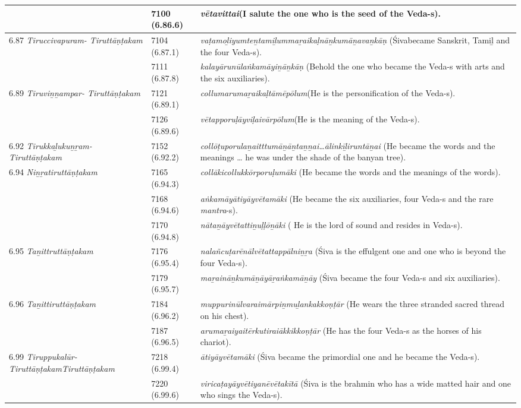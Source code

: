 \begin{longtable}{|m{2.7cm}|m{2.7cm}|>{\raggedright}m{3cm}|}
\hline
 & 7100 (6.86.6) & \textit{vētavittai}(I salute the one who is the seed of the Veda-s). \tabularnewline
\hline
6.87 \textit{Tiruccivapuram- Tiruttāṇṭakam} & 7104 (6.87.1) & \textit{vaṭamoḻiyumteṉtami\-ḻummaṟaikaḷnāṉku\-māṉavaṉkāṇ} (Śivabecame Sanskrit, Tamiḻ and the four Veda-s). \tabularnewline
\hline
 & 7111 (6.87.8) & \textit{kalayārunūlaṅkamāyi\-ṉāṉkāṇ} (Behold the one who became the Veda-s with arts and the six auxiliaries). \tabularnewline
\hline
6.89 \textit{Tiruviṉṉampar- Tiruttāṇṭakam} & 7121 (6.89.1) & \textit{collumarumaṟaikaḷ\-tāmēpōlum}(He is the personification of the Veda-s). \tabularnewline
\hline
 & 7126 (6.89.6) & \textit{vētapporuḷāyviḷaivār\-pōlum}(He is the meaning of the Veda-s). \tabularnewline
\hline
6.92 \textit{Tirukkaḻukuṉṟam- Tiruttāṇṭakam} & 7152 (6.92.2) & \textit{collōṭuporulaṉaitttu\-māṉāṉtaṉṉai…ālinkīḻi\-runtāṉai} (He became the words and the meanings … he was under the shade of the banyan tree). \tabularnewline
\hline
6.94 \textit{Niṉṟatiruttāṇṭakam} & 7165 (6.94.3) & \textit{collākicollukkōrporu\-ḷumāki} (He became the words and the meanings of the words). \tabularnewline
\hline
 & 7168 (6.94.6) & \textit{aṅkamāyātiyāyvēta\-māki} (He became the six auxiliaries, four Veda-s and the rare \textit{mantra}-s). \tabularnewline
\hline
 & 7170 (6.94.8) & \textit{nātaṉāyvētattiṉuḷḷōṉāki }( He is the lord of sound and resides in Veda-s). \tabularnewline
\hline
6.95 \textit{Taṉittruttāṇṭakam} & 7176 (6.95.4) & \textit{nalañcuṭarēnālvētatta\-ppālniṉṟa} (Śiva is the effulgent one and one who is beyond the four Veda-s). \tabularnewline
\hline
 & 7179 (6.95.7) & \textit{maṟaināṉkumāṉāyā\-ṟaṅkamāṉāy} (Śiva became the four Veda-s and six auxiliaries). \tabularnewline
\hline
6.96 \textit{Taṉittiruttāṇ\-ṭakam} & 7184 (6.96.2) & \textit{muppurinūlvaraimār\-piṉmuḻankakkoṇṭār} (He wears the three stranded sacred thread on his chest). \tabularnewline
\hline
 & 7187 (6.96.5) & \textit{arumaṟaiyaitērkuti\-raiākkikkoṇṭār} (He has the four Veda-s as the horses of his chariot). \tabularnewline
\hline
6.99 \textit{Tiruppukalūr- Tiruttāṇṭakam\-Tiruttāṇṭakam} & 7218 (6.99.4) & \textit{ātiyāyvētamāki} (Śiva became the primordial one and he became the Veda-s). \tabularnewline
\hline
 & 7220 (6.99.6) & \textit{viricaṭayāyvētiyanē\-vētakītā} (Śiva is the brahmin who has a wide matted hair and one who sings the Veda-s). \tabularnewline
\hline
\end{longtable}

